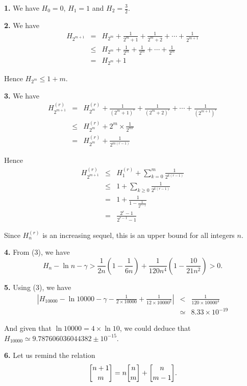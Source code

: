 \documentclass[a4paper,12pt]{article}
\newcommand{\newpar}[1]{\bigskip \noindent \textbf{#1.}}
\newcommand{\stirlingone}[2]{{#1 \atopwithdelims[]#2}}
\begin{document}
\newpar{1}  We have $H_0 = 0$, $H_1 = 1$ and $H_2 = \frac{3}{2}$.

\newpar{2} We have
\begin{eqnarray*}
  H_{2^{m+1}} &=& H_{2^m} + \frac{1}{2^m+1} + \frac{1}{2^m + 2} +
  \cdots + \frac{1}{2^{m+1}} \\
  &\le& H_{2^m} + \frac{1}{2^m} + \frac{1}{2^m} + \cdots +
  \frac{1}{2^m} \\
  &=& H_{2^m} + 1
\end{eqnarray*}

Hence $H_{2^m} \le 1 + m$.

\newpar{3} We have
\begin{eqnarray*}
  H_{2^{m+1}}^{(r)} &=& H_{2^m}^{(r)} + \frac{1}{(2^m+1)^r} +
  \frac{1}{(2^m+2)^r} + \cdots + \frac{1}{(2^{m+1})^r} \\
  &\le& H_{2^m}^{(r)} + 2^m \times \frac{1}{2^{mr}} \\
  &=& H_{2^m}^{(r)} + \frac{1}{2^{m(r-1)}}
\end{eqnarray*}

Hence
\begin{eqnarray*}
  H_{2^{m+1}}^{(r)} &\le& H_{1}^{(r)} + \sum_{k=0}^m
  \frac{1}{2^{k(r-1)}} \\
  &\le& 1 + \sum_{k \ge 0} \frac{1}{2^{k(r-1)}} \\
  &=& 1 + \frac{1}{1 - \frac{1}{2^{r-1}}} \\
  &=& \frac{2^r - 1}{2^{r-1}-1}
\end{eqnarray*}

Since $H_n^{(r)}$ is an increasing sequel, this is an upper bound for
all integers $n$.

\newpar{4} From (3), we have
\[  H_n - \ln n - \gamma > \frac{1}{2n}\left(1 - \frac{1}{6n}\right) +
\frac{1}{120n^4} \left(1 - \frac{10}{21n^2}\right) > 0.\]

\newpar{5} Using (3), we have
\begin{eqnarray*}
  \left| H_{10000} - \ln 10000 - \gamma - \frac{1}{2\times 10000} +
  \frac{1}{12\times 10000^2} \right| &<& \frac{1}{120\times 10000^4} \\
  &\simeq& 8.33 \times 10^{-19}
\end{eqnarray*}

And given that $\ln 10000 = 4 \times \ln 10$, we could deduce that
$H_{10000} \simeq 9.787606036044382 \pm 10^{-15}$.

\newpar{6} Let us remind the relation
\[ \stirlingone{n+1}{m} = n \stirlingone{n}{m} + \stirlingone{n}{m-1}
.\]
\end{document}
